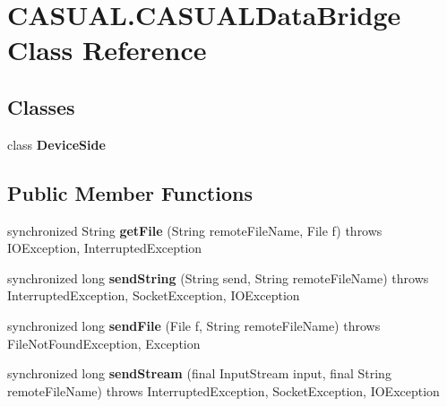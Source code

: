 \hypertarget{classCASUAL_1_1CASUALDataBridge}{\section{C\-A\-S\-U\-A\-L.\-C\-A\-S\-U\-A\-L\-Data\-Bridge Class Reference}
\label{classCASUAL_1_1CASUALDataBridge}
}
\subsection*{Classes}
\begin{DoxyCompactItemize}
\item 
class {\bfseries Device\-Side}
\end{DoxyCompactItemize}
\subsection*{Public Member Functions}
\begin{DoxyCompactItemize}
\item 
\hypertarget{classCASUAL_1_1CASUALDataBridge_a5e0d967936b2a364514ec36e3a9862e2}{synchronized String {\bfseries get\-File} (String remote\-File\-Name, File f)  throws I\-O\-Exception, Interrupted\-Exception }\label{classCASUAL_1_1CASUALDataBridge_a5e0d967936b2a364514ec36e3a9862e2}

\item 
\hypertarget{classCASUAL_1_1CASUALDataBridge_ae83af46e7e309f4f800266408cd84f63}{synchronized long {\bfseries send\-String} (String send, String remote\-File\-Name)  throws Interrupted\-Exception, Socket\-Exception, I\-O\-Exception }\label{classCASUAL_1_1CASUALDataBridge_ae83af46e7e309f4f800266408cd84f63}

\item 
\hypertarget{classCASUAL_1_1CASUALDataBridge_a11dbfc8a7894becee079c99dcbb36627}{synchronized long {\bfseries send\-File} (File f, String remote\-File\-Name)  throws File\-Not\-Found\-Exception, Exception }\label{classCASUAL_1_1CASUALDataBridge_a11dbfc8a7894becee079c99dcbb36627}

\item 
\hypertarget{classCASUAL_1_1CASUALDataBridge_a5e9f37467297dedeecf7f3f2a0ac1abf}{synchronized long {\bfseries send\-Stream} (final Input\-Stream input, final String remote\-File\-Name)  throws Interrupted\-Exception, Socket\-Exception, I\-O\-Exception }\label{classCASUAL_1_1CASUALDataBridge_a5e9f37467297dedeecf7f3f2a0ac1abf}

\end{DoxyCompactItemize}
